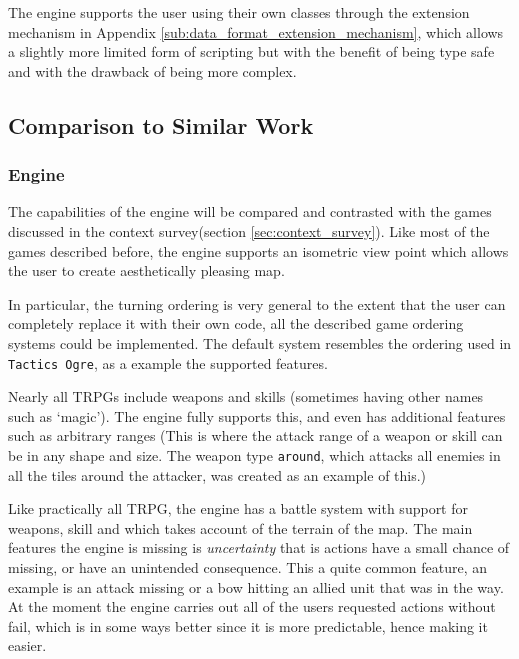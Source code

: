 The engine supports the user using their own classes through the extension mechanism in Appendix \ref{sub:data_format_extension_mechanism}, which allows a slightly more limited form of scripting but with the benefit of being type safe and with the drawback of being more complex.

% 

\subsection{Comparison to Similar Work}
\subsubsection{Engine}
\label{ssub:engine}

The capabilities of the engine will be compared and contrasted with the games discussed in the context survey(section \ref{sec:context_survey}).  Like most of the games described before, the engine supports an isometric view point which allows the user to create aesthetically pleasing map.  
	
In particular, the turning ordering is very general to the extent that the user can completely replace it with their own code, all the described game ordering systems could be implemented.  The default system resembles the ordering used in \texttt{Tactics Ogre}, as a example the supported features. 

Nearly all TRPGs  include weapons and  skills (sometimes having other names such as `magic'). The engine fully supports this, and even has additional features such as arbitrary ranges (This is where the attack range of a weapon or skill can be in any shape and size. The weapon type \texttt{around}, which attacks all enemies in all the tiles around the attacker, was created as an example of this.)

Like practically all TRPG, the engine has a battle system with support for weapons, skill and which takes account of the terrain of the map.  The main features the engine is missing is \emph{uncertainty} that is actions have a small chance of missing, or have an unintended consequence. This a quite common feature, an example is an attack missing or a bow hitting an allied unit that was in the way. At the moment the engine carries out all of the users requested actions without fail, which is in some ways better since it is more predictable, hence making it easier.  

